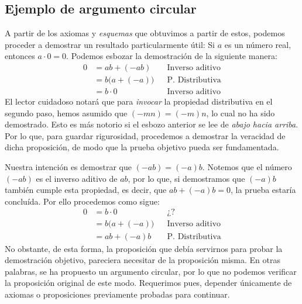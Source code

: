 \documentclass[11pt]{article}
\begin{document}
\subsection*{Ejemplo de argumento circular}

A partir de los axiomas y \textit{esquemas} que obtuvimos a partir de estos, podemos proceder a demostrar un resultado particularmente útil: Si $a$ es un número real, entonces $a\cdot 0 = 0$. Podemos esbozar la demostración de la siguiente manera: \begin{align*}
    0 &= ab + (-ab) && \text{Inverso aditivo}\\
    &= b\bigl(a+(-a)\bigr) && \text{P. Distributiva}\\
    &= b \cdot 0 && \text{Inverso aditivo}
\end{align*}
El lector cuidadoso notará que para \textit{invocar} la propiedad distributiva en el segundo paso, hemos asumido que $(-mn)=(-m)n$, lo cual no ha sido demostrado. Esto es más notorio si el esbozo anterior se lee de \textit{abajo hacia arriba}. Por lo que, para guardar rigurosidad, procedemos a demostrar la veracidad de dicha proposición, de modo que la prueba objetivo pueda ser fundamentada.

Nuestra intención es demostrar que $(-ab)=(-a)b$. Notemos que el número $(-ab)$ es el inverso aditivo de $ab$, por lo que, si demostramos que $(-a)b$ también cumple esta propiedad, es decir, que $ab+(-a)b=0$, la prueba estaría concluída. Por ello procedemos como sigue:
\begin{align*}
    0 &= b \cdot 0&& \text{¿?}\\
    &= b\bigl(a+(-a)\bigr)&& \text{Inverso aditivo}\\
    &= ab + (-a)b && \text{P. Distributiva}
\end{align*}
No obstante, de esta forma, la proposición que debía servirnos para probar la demostración objetivo, pareciera necesitar de la proposición misma. En otras palabras, se ha propuesto un argumento circular, por lo que no podemos verificar la proposición original de este modo. Requerimos pues, depender únicamente de axiomas o proposiciones previamente probadas para continuar.
\end{document}
